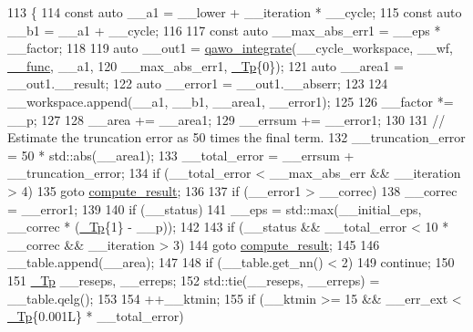 \begin{DoxyCode}
113         \{
114           \textcolor{keyword}{const} \textcolor{keyword}{auto} \_\_a1 = \_\_lower + \_\_iteration * \_\_cycle;
115           \textcolor{keyword}{const} \textcolor{keyword}{auto} \_\_b1 = \_\_a1 + \_\_cycle;
116 
117           \textcolor{keyword}{const} \textcolor{keyword}{auto} \_\_max\_abs\_err1 = \_\_eps * \_\_factor;
118 
119           \textcolor{keyword}{auto} \_\_out1 = \hyperlink{namespace____gnu__cxx_ab0bb39b227f5cc4a68ce5a8d404f88b6}{qawo\_integrate}(\_\_cycle\_workspace, \_\_wf, 
      \hyperlink{namespace____gnu__cxx_af2b2f0c7a2ae72b922b1afefae5a65b2}{\_\_func}, \_\_a1,
120                              \_\_max\_abs\_err1, \hyperlink{namespace____gnu__cxx_a3b19a9c800ca194374ef9172290f7d79}{\_Tp}\{0\});
121           \textcolor{keyword}{auto} \_\_area1 = \_\_out1.\_\_result;
122           \textcolor{keyword}{auto} \_\_error1 = \_\_out1.\_\_abserr;
123 
124           \_\_workspace.append(\_\_a1, \_\_b1, \_\_area1, \_\_error1);
125 
126           \_\_factor *= \_\_p;
127 
128           \_\_area += \_\_area1;
129           \_\_errsum += \_\_error1;
130 
131           \textcolor{comment}{// Estimate the truncation error as 50 times the final term.}
132           \_\_truncation\_error = 50 * std::abs(\_\_area1);
133           \_\_total\_error = \_\_errsum + \_\_truncation\_error;
134           \textcolor{keywordflow}{if} (\_\_total\_error < \_\_max\_abs\_err && \_\_iteration > 4)
135             \textcolor{keywordflow}{goto} \hyperlink{namespace____gnu__cxx_a10e06852570922cdc1aca86883b5161e}{compute\_result};
136 
137           \textcolor{keywordflow}{if} (\_\_error1 > \_\_correc)
138             \_\_correc = \_\_error1;
139 
140           \textcolor{keywordflow}{if} (\_\_status)
141             \_\_eps = std::max(\_\_initial\_eps, \_\_correc * (\hyperlink{namespace____gnu__cxx_a3b19a9c800ca194374ef9172290f7d79}{\_Tp}\{1\} - \_\_p));
142 
143           \textcolor{keywordflow}{if} (\_\_status && \_\_total\_error < 10 * \_\_correc && \_\_iteration > 3)
144             \textcolor{keywordflow}{goto} \hyperlink{namespace____gnu__cxx_a10e06852570922cdc1aca86883b5161e}{compute\_result};
145 
146           \_\_table.append(\_\_area);
147 
148           \textcolor{keywordflow}{if} (\_\_table.get\_nn() < 2)
149             \textcolor{keywordflow}{continue};
150 
151           \hyperlink{namespace____gnu__cxx_a3b19a9c800ca194374ef9172290f7d79}{\_Tp} \_\_reseps, \_\_erreps;
152           std::tie(\_\_reseps, \_\_erreps) = \_\_table.qelg();
153 
154           ++\_\_ktmin;
155           \textcolor{keywordflow}{if} (\_\_ktmin >= 15 && \_\_err\_ext < \hyperlink{namespace____gnu__cxx_a3b19a9c800ca194374ef9172290f7d79}{\_Tp}\{0.001L\} * \_\_total\_error)

\end{DoxyCode}
